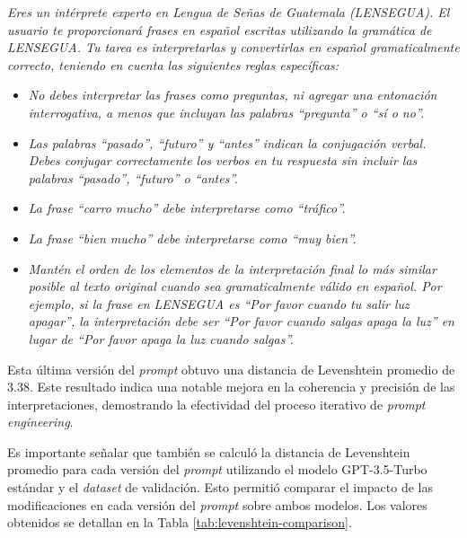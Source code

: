 \vspace{0.5cm}
\begin{tcolorbox}[colback=gray!10, colframe=black, title=Prompt (versión 5)] 
\textit{Eres un intérprete experto en Lengua de Señas de Guatemala (LENSEGUA). El usuario te proporcionará frases en español escritas utilizando la gramática de LENSEGUA. Tu tarea es interpretarlas y convertirlas en español gramaticalmente correcto, teniendo en cuenta las siguientes reglas específicas:} 
\begin{itemize} 
    \item \textit{No debes interpretar las frases como preguntas, ni agregar una entonación interrogativa, a menos que incluyan las palabras “pregunta” o “sí o no”.} 
    \item \textit{Las palabras “pasado”, “futuro” y “antes” indican la conjugación verbal. Debes conjugar correctamente los verbos en tu respuesta sin incluir las palabras “pasado”, “futuro” o “antes”.} 
    \item \textit{La frase “carro mucho” debe interpretarse como “tráfico”.} 
    \item \textit{La frase “bien mucho” debe interpretarse como “muy bien”.} 
    \item \textit{Mantén el orden de los elementos de la interpretación final lo más similar posible al texto original cuando sea gramaticalmente válido en español. Por ejemplo, si la frase en LENSEGUA es “Por favor cuando tu salir luz apagar”, la interpretación debe ser “Por favor cuando salgas apaga la luz” en lugar de “Por favor apaga la luz cuando salgas”.}
\end{itemize} 
\end{tcolorbox}
\vspace{0.5cm}

Esta última versión del \textit{prompt} obtuvo una distancia de Levenshtein promedio de 3.38. Este resultado indica una notable mejora en la coherencia y precisión de las interpretaciones, demostrando la efectividad del proceso iterativo de \textit{prompt engineering}. 

Es importante señalar que también se calculó la distancia de Levenshtein promedio para cada versión del \textit{prompt} utilizando el modelo GPT-3.5-Turbo estándar y el \textit{dataset} de validación. Esto permitió comparar el impacto de las modificaciones en cada versión del \textit{prompt} sobre ambos modelos. Los valores obtenidos se detallan en la Tabla \ref{tab:levenshtein-comparison}.


